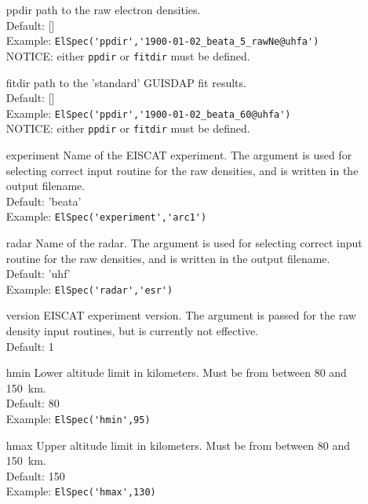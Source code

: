 \documentclass[12pt,a4paper]{report}
\begin{document}
\begin{itemize}

\item[ppdir] path to the raw electron densities.\\
Default: []\\
Example: \verb|ElSpec('ppdir','1900-01-02_beata_5_rawNe@uhfa')|\\
NOTICE: either \verb|ppdir| or \verb|fitdir| must be defined.

\item[fitdir] path to the 'standard' GUISDAP fit results.\\
Default: []\\
Example: \verb|ElSpec('ppdir','1900-01-02_beata_60@uhfa')|\\
NOTICE: either \verb|ppdir| or \verb|fitdir| must be defined.

\item[experiment] Name of the EISCAT experiment. The argument is used for selecting correct input routine for the raw densities, and is written in the output filename.\\
Default: 'beata' \\
Example: \verb|ElSpec('experiment','arc1')|\\

\item[radar] Name of the radar.  The argument is used for selecting correct input routine for the raw densities, and is written in the output filename.\\
Default: 'uhf'\\
Example: \verb|ElSpec('radar','esr')|\\

\item[version] EISCAT experiment version. The argument is passed for the raw density input routines, but is currently not effective.\\
Default: 1 \\

\item[hmin] Lower altitude limit in kilometers. Must be from between 80 and 150~km.\\
Default: 80\\
Example: \verb|ElSpec('hmin',95)|\\

\item[hmax] Upper altitude limit in kilometers. Must be from between 80 and 150~km.\\
Default: 150\\
Example: \verb|ElSpec('hmax',130)|\\


\end{itemize}
\end{document}

